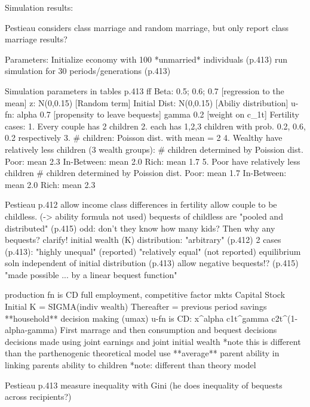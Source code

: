\documentclass{article}
\begin{document}
Simulation results:

Pestieau considers class marriage and random marriage, but only report class marriage results?

\begin{verbatimtab}
Parameters:
	Initialize economy with 100 *unmarried* individuals (p.413)
	run simulation for 30 periods/generations (p.413)

Simulation parameters in tables p.413 ff
	Beta:			0.5; 0.6; 0.7	[regression to the mean]
	z: 				N(0,0.15)		[Random term]
	Initial Dist:	N(0,0.15)		[Abiliy distribution]
	u-fn:	alpha	0.7				[propensity to leave bequests]
			gamma	0.2				[weight on c_1t]
	Fertility cases:
		1. Every couple has 2 children
		2. each has 1,2,3 children with prob. 0.2, 0.6, 0.2 respectively
		3. # children: Poisson dist. with mean = 2
		4. Wealthy have relatively less children (3 wealth groups): 
			# children determined by Poission dist. 
			Poor: 		mean 2.3
			In-Between: mean 2.0
			Rich:		mean 1.7
		5. Poor have relatively less children 
			# children determined by Poission dist.
			Poor:		mean 1.7
			In-Between:	mean 2.0
			Rich:		mean 2.3
\end{verbatimtab}

\begin{verbatimtab}[4]
Pestieau p.412
	allow income class differences in fertility
	allow couple to be childless. (-> ability formula not used)
		bequests of childless are "pooled and distributed" (p.415)
		odd: don't they know how many kids? Then why any bequests? clarify!
	initial wealth (K) distribution:
		"arbitrary" (p.412)
		2 cases (p.413):
			"highly unequal" (reported)
			"relatively equal" (not reported)
			equilibrium soln independent of initial distribution (p.413)
	allow negative bequests!? (p.415)
		"made possible ... by a linear bequest function"
			
	production fn is CD
	full employment, competitive factor mkts
	Capital Stock
		Initial K = SIGMA(indiv wealth)
		Thereafter = previous period savings
	**household** decision making (umax)
		u-fn is CD: x^alpha c1t^gamma c2t^(1-alpha-gamma)
	First marrage and then consumption and bequest decisions
		decisions made using joint earnings and joint initial wealth
			*note this is different than the parthenogenic theoretical model
	use **average** parent ability in linking parents ability to children
		*note: different than theory model
	
Pestieau p.413
	measure inequality with Gini (he does inequality of bequests across recipients?)

\end{verbatimtab}
\end{document}
